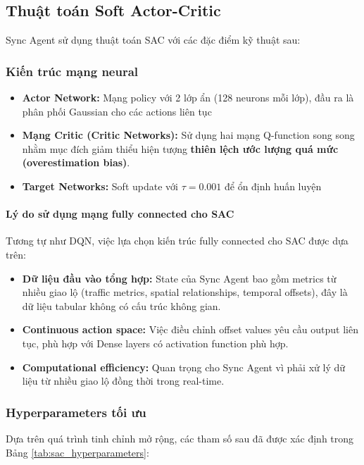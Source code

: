 \subsection{Thuật toán Soft Actor-Critic}
Sync Agent sử dụng thuật toán SAC với các đặc điểm kỹ thuật sau:

\subsubsection{Kiến trúc mạng neural}
\begin{itemize}
    \item \textbf{Actor Network:} Mạng policy với 2 lớp ẩn (128 neurons mỗi lớp),
        đầu ra là phân phối Gaussian cho các actions liên tục

    \item \textbf{Mạng Critic (Critic Networks):} Sử dụng hai mạng Q-function song song nhằm mục đích giảm thiểu hiện tượng \textbf{thiên lệch ước lượng quá mức (overestimation bias)}.

    \item \textbf{Target Networks:} Soft update với $\tau = 0.001$ để ổn định
        huấn luyện
\end{itemize}

\paragraph{Lý do sử dụng mạng fully connected cho SAC}
Tương tự như DQN, việc lựa chọn kiến trúc fully connected cho SAC được dựa trên:
\begin{itemize}
    \item \textbf{Dữ liệu đầu vào tổng hợp:} State của Sync Agent bao gồm metrics từ nhiều giao lộ (traffic metrics, spatial relationships, temporal offsets), đây là dữ liệu tabular không có cấu trúc không gian.
    \item \textbf{Continuous action space:} Việc điều chỉnh offset values yêu cầu output liên tục, phù hợp với Dense layers có activation function phù hợp.
    \item \textbf{Computational efficiency:} Quan trọng cho Sync Agent vì phải xử lý dữ liệu từ nhiều giao lộ đồng thời trong real-time.
\end{itemize}

\subsubsection{Hyperparameters tối ưu}
Dựa trên quá trình tinh chỉnh mở rộng, các tham số sau đã được xác định trong Bảng \ref{tab:sac_hyperparameters}:

